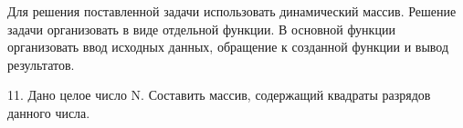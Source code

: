 Для решения поставленной задачи использовать динамический массив.
Решение задачи организовать в виде отдельной функции. В основной функции
организовать ввод исходных данных, обращение к созданной функции и вывод
результатов.

11. Дано целое число N. Составить массив, содержащий квадраты 
разрядов данного числа.
